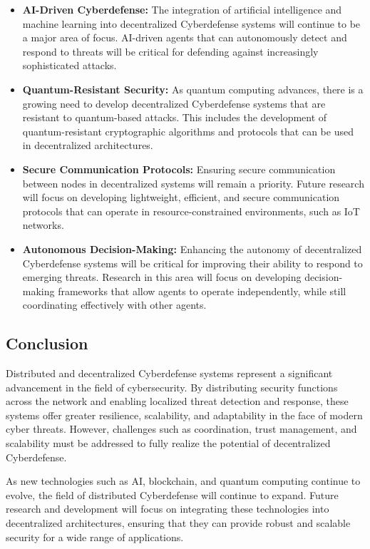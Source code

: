 \begin{itemize}
    \item \textbf{AI-Driven Cyberdefense:} The integration of artificial intelligence and machine learning into decentralized Cyberdefense systems will continue to be a major area of focus. AI-driven agents that can autonomously detect and respond to threats will be critical for defending against increasingly sophisticated attacks.
    
    \item \textbf{Quantum-Resistant Security:} As quantum computing advances, there is a growing need to develop decentralized Cyberdefense systems that are resistant to quantum-based attacks. This includes the development of quantum-resistant cryptographic algorithms and protocols that can be used in decentralized architectures.
    
    \item \textbf{Secure Communication Protocols:} Ensuring secure communication between nodes in decentralized systems will remain a priority. Future research will focus on developing lightweight, efficient, and secure communication protocols that can operate in resource-constrained environments, such as IoT networks.
    
    \item \textbf{Autonomous Decision-Making:} Enhancing the autonomy of decentralized Cyberdefense systems will be critical for improving their ability to respond to emerging threats. Research in this area will focus on developing decision-making frameworks that allow agents to operate independently, while still coordinating effectively with other agents.
\end{itemize}

\subsection{Conclusion}

Distributed and decentralized Cyberdefense systems represent a significant advancement in the field of cybersecurity. By distributing security functions across the network and enabling localized threat detection and response, these systems offer greater resilience, scalability, and adaptability in the face of modern cyber threats. However, challenges such as coordination, trust management, and scalability must be addressed to fully realize the potential of decentralized Cyberdefense.

As new technologies such as AI, blockchain, and quantum computing continue to evolve, the field of distributed Cyberdefense will continue to expand. Future research and development will focus on integrating these technologies into decentralized architectures, ensuring that they can provide robust and scalable security for a wide range of applications.




